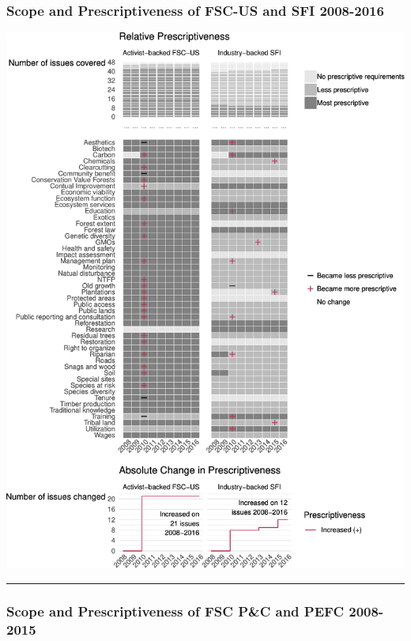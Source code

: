 \documentclass[
      12pt,
        ]{article}
\begin{document}
\subsubsection{Scope and Prescriptiveness of FSC-US and SFI
2008-2016}\label{scope-and-prescriptiveness-of-fsc-us-and-sfi-2008-2016}

\begin{center}\includegraphics{Figs/FSC-SFI-1} \end{center}

\begin{center}\rule{0.5\linewidth}{\linethickness}\end{center}

\subsubsection{Scope and Prescriptiveness of FSC P\&C and PEFC
2008-2015}\label{scope-and-prescriptiveness-of-fsc-pc-and-pefc-2008-2015}
\end{document}
